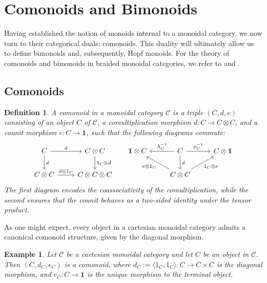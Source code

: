 \documentclass{amsart}
\newtheorem{definition}{Definition}[section]
\newtheorem{example}{Example}[section]
\begin{document}
\section{Comonoids and Bimonoids}\label{sec:bimonoids}

Having established the notion of monoids internal to a monoidal category, we now turn to their categorical duals: comonoids. This duality will ultimately allow us to define bimonoids and, subsequently, Hopf monoids. For the theory of comonoids and bimonoids in braided monoidal categories, we refer to \cite{MF} and \cite{BT}.

\subsection{Comonoids}

\begin{definition}\label{def:comonoid}
A comonoid in a monoidal category $\mathcal{C}$ is a triple $(C, d, e)$ consisting of an object $C$ of $\mathcal{C}$, a comultiplication morphism $d \colon C \longrightarrow C \otimes C$, and a counit morphism $e \colon C \longrightarrow \mathbf{1}$, such that the following diagrams commute:
\[
\begin{tikzcd}
C\arrow{r}{d} \arrow{d}{d}& C\otimes C\arrow{d}{1_C\otimes d}\\
C\otimes C\arrow{r}{d\otimes 1_C} & C\otimes C\otimes C
\end{tikzcd}
\;\;\;\;\;
\begin{tikzcd}
\mathbf{1}\otimes C & C\arrow{d}{d}\arrow[swap]{l}{\lambda^{-1}_C}\arrow{r}{\rho^{-1}_C} & C\otimes \mathbf{1}\\
& C\otimes C \arrow{ul}{e\otimes 1_C}\arrow[swap]{ur}{1_C\otimes e}
\end{tikzcd}
\]
The first diagram encodes the coassociativity of the comultiplication, while the second ensures that the counit behaves as a two-sided identity under the tensor product.
\end{definition}

As one might expect, every object in a cartesian monoidal category admits a canonical comonoid structure, given by the diagonal morphism.

\begin{example}\label{ex:comonoid_cartesian}
Let $\mathcal{C}$ be a cartesian monoidal category and let $C$ be an object in $\mathcal{C}$. Then $(C, d_C, e_C)$ is a comonoid, where $d_C := \langle 1_C, 1_C \rangle \colon C \to C \times C$ is the diagonal morphism, and $e_C \colon C \longrightarrow \mathbf{1}$ is the unique morphism to the terminal object.
\end{example}
\end{document}
